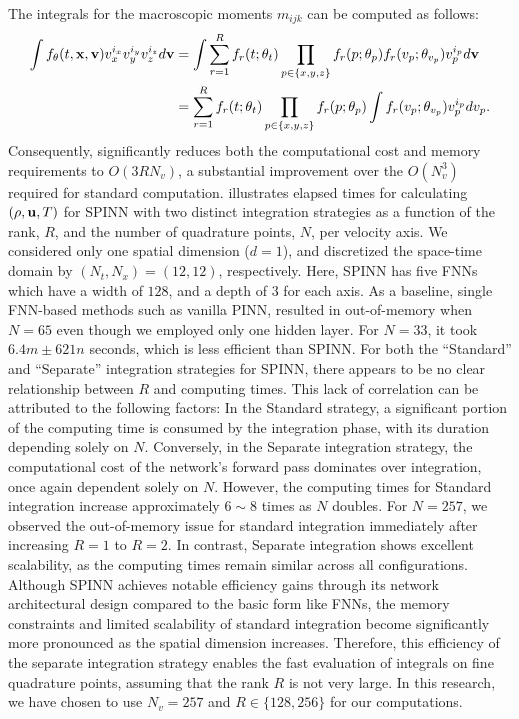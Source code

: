 \documentclass[preprint,12pt]{elsarticle}
\begin{document}
The integrals for the macroscopic moments \(m_{ijk}\) can be computed as follows:
\begin{equation}\label{eq:separable_integral}
    \begin{split}
            \int f_\theta(t,{\bf x,v}) v_x^{i_x} v_y^{i_y} v_z^{i_z} d{\bf v}
            &= \int \sum_{r=1}^R f_r(t;\theta_t) \prod_{p \in \{x,y,z\}} f_r(p;\theta_p) f_r(v_p; \theta_{v_p}) v_p^{i_p} d{\bf v} \\
            &= \sum_{r=1}^R f_r(t; \theta_t) \prod_{p \in \{x,y,z\}}  f_r(p; \theta_p) \int  f_r(v_p; \theta_{v_p})v_p^{i_p} dv_p.
    \end{split}
\end{equation}
Consequently,  significantly reduces both the computational cost and memory requirements to $O(3RN_v)$, a substantial improvement over the $O(N_v^3)$ required for standard computation.
{ illustrates elapsed times for calculating $(\rho, {\bf u}, T)$ for SPINN with two distinct integration strategies as a function of the rank, $R$, and the number of quadrature points, $N$, per velocity axis.
We considered only one spatial dimension ($d=1$),
and discretized the space-time domain by $(N_t, N_x) = (12,12)$, respectively.
Here, SPINN has five FNNs which have a width of $128$, and a depth of $3$ for each axis.
As a baseline, single FNN-based methods such as vanilla PINN, resulted in out-of-memory when $N=65$ even though we employed only one hidden layer.
For $N=33$, it took $6.4m \pm 621n$ seconds, which is less efficient than SPINN.
For both the ``Standard'' and ``Separate'' integration strategies for SPINN, there appears to be no clear relationship between $R$ and computing times.
This lack of correlation can be attributed to the following factors: In the Standard strategy, a significant portion of the computing time is consumed by the integration phase, with its duration depending solely on $N$.
Conversely, in the Separate integration strategy, the computational cost of the network's forward pass dominates over integration, once again dependent solely on $N$.
However, the computing times for Standard integration increase approximately $6 \sim 8$ times as $N$ doubles.
For $N=257$, we observed the out-of-memory issue for standard integration immediately after increasing $R=1$ to $R=2$.
In contrast, Separate integration shows excellent scalability, as the computing times remain similar across all configurations.
Although SPINN achieves notable efficiency gains through its network architectural design compared to the basic form like FNNs, the memory constraints and limited scalability of standard integration become significantly more pronounced as the spatial dimension increases.
Therefore, this efficiency of the separate integration strategy enables the fast evaluation of integrals on fine quadrature points, assuming that the rank $R$ is not very large.
}
In this research, we have chosen to use $N_v = 257$ and $R \in \{128, 256\}$ for our computations.
\end{document}
